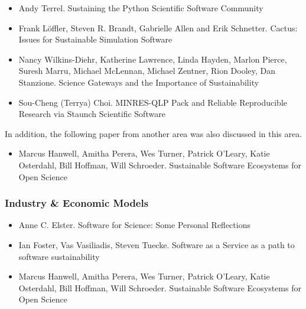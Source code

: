 \documentclass[11pt, oneside]{amsart}
\begin{document}
\begin{itemize}
\item Andy Terrel. Sustaining the Python Scientific Software
  Community~\cite{Terrel_WSSSPE}

\item Frank L\"{o}ffler, Steven R. Brandt, Gabrielle Allen and Erik
  Schnetter. Cactus: Issues for Sustainable Simulation
  Software~\cite{Loffler_WSSSPE}

\item Nancy Wilkins-Diehr, Katherine Lawrence, Linda Hayden, Marlon
  Pierce, Suresh Marru, Michael McLennan, Michael Zentner, Rion
  Dooley, Dan Stanzione. Science Gateways and the Importance of
  Sustainability~\cite{Wilkins-Diehr_WSSSPE}


\item Sou-Cheng (Terrya) Choi. MINRES-QLP Pack and Reliable
  Reproducible Research via Staunch Scientific Software~\cite{Choi_WSSSPE}


\end{itemize}

In addition, the following paper from another area was also discussed
in this area.

\begin{itemize}

\item Marcus Hanwell, Amitha Perera, Wes Turner, Patrick O'Leary,
  Katie Osterdahl, Bill Hoffman, Will Schroeder. Sustainable Software
  Ecosystems for Open Science~\cite{Hanwell_WSSSPE}

\end{itemize}

\subsubsection*{Industry \& Economic Models}

\begin{itemize}

\item Anne C. Elster. Software for Science: Some Personal
  Reflections~\cite{Elster_WSSSPE}

\item Ian Foster, Vas Vasiliadis, Steven Tuecke. Software as a Service
  as a path to software sustainability~\cite{Foster_WSSSPE}

\item Marcus Hanwell, Amitha Perera, Wes Turner, Patrick O'Leary,
  Katie Osterdahl, Bill Hoffman, Will Schroeder. Sustainable Software
  Ecosystems for Open Science~\cite{Hanwell_WSSSPE}

\end{itemize}
\end{document}
